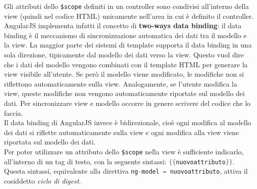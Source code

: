 Gli attributi dello \lstinline[language=HTML]!$scope! definiti in un controller sono condivisi all'interno della view (quindi nel codice HTML) unicamente nell'area in cui è definito il controller. AngularJS implementa infatti il concetto di \textbf{two-ways data binding}: il data binding è il meccanismo di sincronizzazione automatica dei dati tra il modello e la view. La maggior parte dei sistemi di template supporta il data binding in una sola direzione, tipicamente dal modello dei dati verso la view. Questo vuol dire che i dati del modello vengono combinati con il template HTML per generare la view visibile all’utente. Se però il modello viene modificato, le modifiche non si riflettono automaticamente sulla view. Analogamente, se l’utente modifica la view, queste modifiche non vengono automaticamente riportate sul modello dei dati. Per sincronizzare view e modello occorre in genere scrivere del codice che lo faccia.\\
Il data binding di AngularJS invece è bidirezionale, cioè ogni modifica al modello dei dati si riflette automaticamente sulla view e ogni modifica alla view viene riportata sul modello dei dati.\\
Per poter utilizzare un attributo dello \lstinline[language=HTML]!$scope! nella view è sufficiente indicarlo, all'interno di un tag di testo, con la seguente sintassi: \lstinline[language=Java]!{{nuovoattributo}}!. Questa sintassi, equivalente alla direttiva \lstinline[language=Java]!ng-model = nuovoattributo!, attiva il cosiddetto \emph{ciclo di digest}.

